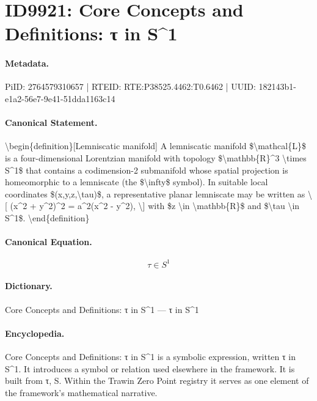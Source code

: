 \section*{ID9921: Core Concepts and Definitions: τ in S\textasciicircum{}1}
\paragraph{Metadata.}
PiID: 2764579310657 | RTEID: RTE:P38525.4462:T0.6462 | UUID: 182143b1-e1a2-56e7-9e41-51dda1163c14

\paragraph{Canonical Statement.}
\textbackslash{}begin\{definition\}[Lemniscatic manifold] A lemniscatic manifold \$\textbackslash{}mathcal\{L\}\$ is a four-dimensional Lorentzian manifold with topology \$\textbackslash{}mathbb\{R\}\textasciicircum{}3 \textbackslash{}times S\textasciicircum{}1\$ that contains a codimension-2 submanifold whose spatial projection is homeomorphic to a lemniscate (the \$\textbackslash{}infty\$ symbol). In suitable local coordinates \$(x,y,z,\textbackslash{}tau)\$, a representative planar lemniscate may be written as \textbackslash{}[ (x\textasciicircum{}2 + y\textasciicircum{}2)\textasciicircum{}2 = a\textasciicircum{}2(x\textasciicircum{}2 - y\textasciicircum{}2), \textbackslash{}] with \$z \textbackslash{}in \textbackslash{}mathbb\{R\}\$ and \$\textbackslash{}tau \textbackslash{}in S\textasciicircum{}1\$. \textbackslash{}end\{definition\}

\paragraph{Canonical Equation.}
\[
\tau \in S^1
\]

\paragraph{Dictionary.}
Core Concepts and Definitions: τ in S\textasciicircum{}1 — τ in S\textasciicircum{}1

\paragraph{Encyclopedia.}
Core Concepts and Definitions: τ in S\textasciicircum{}1 is a symbolic expression, written τ in S\textasciicircum{}1. It introduces a symbol or relation used elsewhere in the framework. It is built from τ, S. Within the Trawin Zero Point registry it serves as one element of the framework's mathematical narrative.
